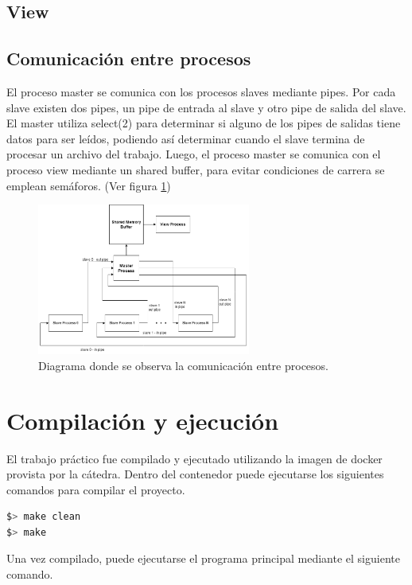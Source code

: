 \documentclass{article}
\begin{document}
\subsection{View}

\subsection{Comunicación entre procesos}

El proceso master se comunica con los procesos slaves mediante pipes. Por cada slave existen dos pipes, un pipe de entrada al slave y otro pipe de salida del slave. El master utiliza select(2) para determinar si alguno de los pipes de salidas tiene datos para ser leídos, podiendo así determinar cuando el slave termina de procesar un archivo del trabajo. Luego, el proceso master se comunica con el proceso view mediante un shared buffer, para evitar condiciones de carrera se emplean semáforos. (Ver figura \ref{fig:diagramaComunicacion})

\begin{figure}[H]
\begin{center}
\includegraphics[width=70mm]{diagramaComunicacion}
\caption{Diagrama donde se observa la comunicación entre procesos.}
\label{fig:diagramaComunicacion}
\end{center}
\end{figure}

\section{Compilación y ejecución}

El trabajo práctico fue compilado y ejecutado utilizando la imagen de docker provista por la cátedra. Dentro del contenedor puede ejecutarse los siguientes comandos para compilar el proyecto.

\begin{lstlisting}[language=bash]
$> make clean
$> make
\end{lstlisting}
Una vez compilado, puede ejecutarse el programa principal mediante el siguiente comando.
\end{document}
